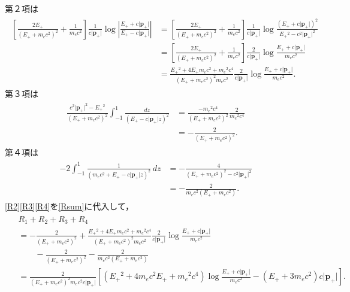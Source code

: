 第２項は
\begin{align}
  \begin{split}
    \left[\frac{2E_+}{(E_+ + m_ec^2)^2} + \frac{1}{m_ec^2}\right] \frac{1}{c\lvert\boldsymbol{p}_+\rvert} \log\left\lvert\frac{E_+ + c\lvert\boldsymbol{p}_+\rvert}{E_+ - c\lvert\boldsymbol{p}_+\rvert}\right\rvert &= \left[\frac{2E_+}{(E_+ + m_ec^2)^2} + \frac{1}{m_ec^2}\right] \frac{1}{c\lvert\boldsymbol{p}_+\rvert} \log\frac{(E_+ + c\lvert\boldsymbol{p}_+\rvert)^2}{E_+{}^2 - c^2\lvert\boldsymbol{p}_+\rvert^2} \\
    &= \left[\frac{2E_+}{(E_+ + m_ec^2)^2} + \frac{1}{m_ec^2}\right] \frac{2}{c\lvert\boldsymbol{p}_+\rvert} \log \frac{E_+ + c\lvert\boldsymbol{p}_+\rvert}{m_ec^2} \\
    &= \frac{E_+{}^2 + 4E_+m_ec^2 + m_e{}^2c^4}{(E_+ + m_ec^2)^2m_ec^2} \frac{2}{c\lvert\boldsymbol{p}_+\rvert} \log \frac{E_+ + c\lvert\boldsymbol{p}_+\rvert}{m_ec^2}.
  \end{split}\label{R2}
\end{align}
第３項は
\begin{align}
  \begin{split}
    \frac{c^2\lvert\boldsymbol{p}_+\rvert^2 - E_+{}^2}{(E_+ + m_ec^2)^2} \int_{-1}^1 \frac{dz}{(E_+ - c\lvert\boldsymbol{p}_+\rvert z)^2} &= \frac{-m_e{}^2c^4}{(E_+ + m_ec^2)^2}\frac{2}{m_e{}^2c^4} \\
    &= -\frac{2}{(E_+ + m_ec^2)^2}.
  \end{split}\label{R3}
\end{align}
第４項は
\begin{align}
  \begin{split}
    - 2\int_{-1}^1 \frac{1}{(m_ec^2 + E_+ - c\lvert\boldsymbol{p}_+\rvert z)^2}\,dz &= -\frac{4}{(E_++m_ec^2)^2 - c^2\lvert\boldsymbol{p}_+\rvert^2} \\
    &= -\frac{2}{m_ec^2(E_+ + m_ec^2)}.
  \end{split}\label{R4}
\end{align}
\eqref{R2}\eqref{R3}\eqref{R4}を\eqref{Rsum}に代入して，
\begin{align}
  \begin{split}
    & R_1 + R_2 + R_3 + R_4 \\
    &= -\frac{2}{(E_+ + m_ec^2)^2} + \frac{E_+{}^2 + 4E_+m_ec^2 + m_e{}^2c^4}{(E_+ + m_ec^2)^2m_ec^2} \frac{2}{c\lvert\boldsymbol{p}_+\rvert} \log \frac{E_+ + c\lvert\boldsymbol{p}_+\rvert}{m_ec^2} \\
    &\qquad - \frac{2}{(E_+ + m_ec^2)^2} - \frac{2}{m_ec^2(E_+ + m_ec^2)} \\
    &= \frac{2}{(E_+ + m_ec^2)^2m_ec^2c\lvert\boldsymbol{p}_+\rvert} \left[(E_+{}^2 + 4m_ec^2E_+ + m_e{}^2c^4)\log \frac{E_+ + c\lvert\boldsymbol{p}_+\rvert}{m_ec^2} - (E_+ + 3m_ec^2) c\lvert\boldsymbol{p}_+\rvert\right].
  \end{split}
\end{align}
